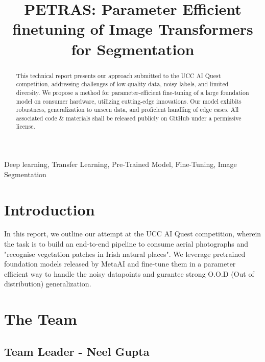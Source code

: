 \documentclass[conference]{IEEEtran}
\begin{document}
\title{PETRAS: \textbf{P}arameter \textbf{E}fficient finetuning of Image \textbf{Tra}nsformers for \textbf{S}egmentation}

\author{
}

\maketitle

\begin{abstract}
This technical report presents our approach submitted to the UCC AI Quest competition, addressing challenges of low-quality data, noisy labels, and limited diversity. We propose a method for parameter-efficient fine-tuning of a large foundation model on consumer hardware, utilizing cutting-edge innovations. Our model exhibits robustness, generalization to unseen data, and proficient handling of edge cases. All associated code \& materials shall be released publicly on GitHub under a permissive license.
\end{abstract}

\begin{IEEEkeywords}
Deep learning, Transfer Learning, Pre-Trained Model, Fine-Tuning, Image Segmentation
\end{IEEEkeywords}

\section{Introduction}
In this report, we outline our attempt at the UCC AI Quest competition, wherein the task is to build an end-to-end pipeline to consume aerial photographs and "recognise vegetation patches in Irish natural places". \newline \break
We leverage pretrained foundation models released by MetaAI and fine-tune them in a parameter efficient way to handle the noisy datapoints and gurantee strong O.O.D (Out of distribution) generalization.
\section{The Team}

\subsection{Team Leader - Neel Gupta}
\end{document}
